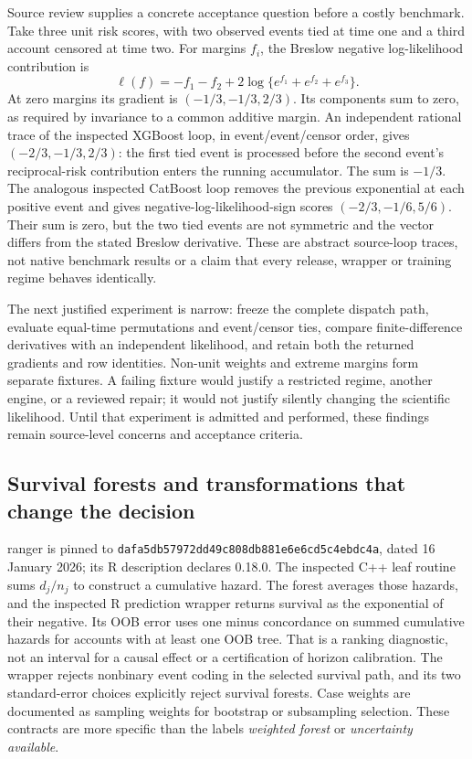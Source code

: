 Source review supplies a concrete acceptance question before a costly benchmark.
Take three unit risk scores, with two observed events tied at time one and a
third account censored at time two. For margins $f_i$, the Breslow negative
log-likelihood contribution is
\[
 \ell(f)=-f_1-f_2+2\log\{e^{f_1}+e^{f_2}+e^{f_3}\}.
\]
At zero margins its gradient is $(-1/3,-1/3,2/3)$. Its components sum to zero,
as required by invariance to a common additive margin. An independent rational
trace of the inspected XGBoost loop, in event/event/censor order, gives
$(-2/3,-1/3,2/3)$: the first tied event is processed before the second event's
reciprocal-risk contribution enters the running accumulator. The sum is
$-1/3$. The analogous inspected CatBoost loop removes the previous exponential
at each positive event and gives negative-log-likelihood-sign scores
$(-2/3,-1/6,5/6)$. Their sum is zero, but the two tied events are not symmetric
and the vector differs from the stated Breslow derivative. These are abstract
source-loop traces, not native benchmark results or a claim that every release,
wrapper or training regime behaves identically.~\citep{exec24_longcxx_xgboost,exec24_longcxx_catboost,exec24_longcxx_reference}

The next justified experiment is narrow: freeze the complete dispatch path,
evaluate equal-time permutations and event/censor ties, compare finite-difference
derivatives with an independent likelihood, and retain both the returned
gradients and row identities. Non-unit weights and extreme margins form separate
fixtures. A failing fixture would justify a restricted regime, another engine,
or a reviewed repair; it would not justify silently changing the scientific
likelihood. Until that experiment is admitted and performed, these findings
remain source-level concerns and acceptance criteria.

\subsection{Survival forests and transformations that change the decision}

ranger is pinned to
\texttt{dafa5db57972dd49c808db881e6e6cd5c4ebdc4a}, dated 16 January
2026; its R description declares 0.18.0. The inspected C++ leaf routine sums
$d_j/n_j$ to construct a cumulative hazard. The forest averages those hazards,
and the inspected R prediction wrapper returns survival as the exponential of
their negative. Its OOB error uses one minus concordance on summed cumulative
hazards for accounts with at least one OOB tree. That is a ranking diagnostic,
not an interval for a causal effect or a certification of horizon calibration.
The wrapper rejects nonbinary event coding in the selected survival path, and
its two standard-error choices explicitly reject survival forests. Case weights
are documented as sampling weights for bootstrap or subsampling selection.
These contracts are more specific than the labels \emph{weighted forest} or
\emph{uncertainty available}.~\citep{exec24_longcxx_ranger}

